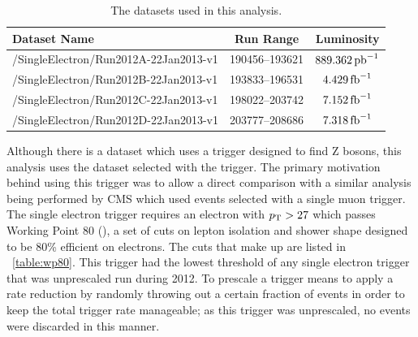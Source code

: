 \begin{table}[h]
\centering
\begin{center}
    \begin{tabular}{ | l | c | c |}
    \hline
    Dataset Name                          & Run Range      & Luminosity       \\ \hline
    /SingleElectron/Run2012A-22Jan2013-v1 & 190456--193621 & $889.362 \mbox{\ensuremath{\,\text{pb}^\text{$-$1}}}$ \\ \hline
    /SingleElectron/Run2012B-22Jan2013-v1 & 193833--196531 & $4.429 \mbox{\ensuremath{\,\text{fb}^\text{$-$1}}}$   \\ \hline
    /SingleElectron/Run2012C-22Jan2013-v1 & 198022--203742 & $7.152 \mbox{\ensuremath{\,\text{fb}^\text{$-$1}}}$   \\ \hline
    /SingleElectron/Run2012D-22Jan2013-v1 & 203777--208686 & $7.318 \mbox{\ensuremath{\,\text{fb}^\text{$-$1}}}$   \\ \hline
    \end{tabular}
\end{center}
\caption{
    The datasets used in this analysis.
}
\label{table:datasets}
\end{table}

Although there is a \DoubleElectron dataset which uses a trigger designed to
find Z bosons, this analysis uses the \SingleElectron dataset selected with the
\SingleElectronTrigger trigger. The primary motivation behind using this
trigger was to allow a direct comparison with a similar \phistar analysis being
performed by CMS which used \Ztomumu events selected with a single muon
trigger. The single electron trigger requires an electron with $p_{\mathrm{T}} > 27$ which
passes Working Point 80 (\WPEighty), a set of cuts on lepton isolation and
shower shape designed to be 80\% efficient on electrons. The cuts that make up
\WPEighty are listed in \TAB~\ref{table:wp80}. This trigger had the lowest \pt
threshold of any single electron trigger that was unprescaled run during 2012.
To prescale a trigger means to apply a rate reduction by randomly throwing out
a certain fraction of events in order to keep the total trigger rate
manageable; as this trigger was unprescaled, no events were discarded in this
manner.

